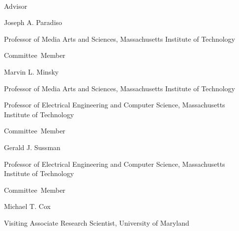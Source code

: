 \thispagestyle{empty}
\begin{center}
    \spacedlowsmallcaps{\myName} \\ \medskip                        

    \begingroup
        \color{Maroon}\spacedallcaps{\myTitle}
    \endgroup
\end{center}        

\begin{flushright}
           Advisor\hspace{0.5cm}~\makebox[2in]{\hrulefill}

                                 Joseph A. Paradiso

                                 Professor of Media Arts and Sciences, Massachusetts Institute of Technology
                                 
  \vspace{5mm}
  
  Committee~Member\hspace{0.5cm}~\makebox[2in]{\hrulefill}
  
                                 Marvin L. Minsky

                                 Professor of Media Arts and Sciences, Massachusetts Institute of Technology

                                 Professor of Electrical Engineering and Computer Science, Massachusetts Institute of Technology
                                 
  Committee~Member\hspace{0.5cm}~\makebox[2in]{\hrulefill}
  
                                 Gerald J. Sussman

                                 Professor of Electrical Engineering and Computer Science, Massachusetts Institute of Technology

  Committee~Member\hspace{0.5cm}~\makebox[2in]{\hrulefill}

                                 Michael T. Cox

                                 Visiting Associate Research Scientist, University of Maryland

\end{flushright}


